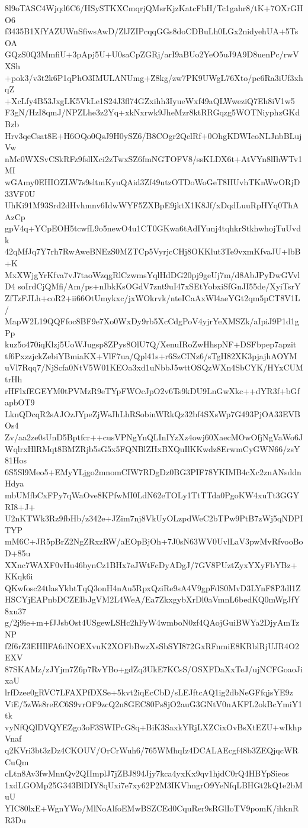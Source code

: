 8l9oTASC4Wjqd6C6/HSySTKXCmqrjQMsrKjzKatcFhH/Tc1gahr8/tK+7OXrGHO6
f3435B1XfYAZUWnSfiwsAwD/ZlJZIPcqqGGs8doCDBuLh0LGx2nidyehUA+5TsOA
GQzS0Q3MmfiU+3pApj5U+U0saCpZGRj/arI9aBUo2YeO5uJ9A9D8uenPc/rwVXSh
+pok3/v3t2k6P1qPhO3IMULANUmg+Z8kg/zw7PK9UWgL76Xto/pc6Ra3iUf3xhqZ
+XcLfy4B53JxgLK5VkLe1S24J3fl74GZxihh3IyueWxf49aQLWweziQ7Eh8iV1w5
F3gN/HzI8qmJ/NPZLhe3z2Yq+xkNxrwk9JheMzr8ktRRGqzg5WOTNiyphzGKdBzb
Hrv3qeCsat8E+H6OQo0QsJ9H0ySZ6/B8COgr2QelRf+0OhgKDWIcoNLJnbBLujVw
nMc0WXSvCSkRFz9fsllXci2zTwxSZ6fmNGTOFV8/ssKLDX6t+AtVYn8lIhWTv1MI
wGAmy0EHIOZLW7s9sltmKyuQAid3Zf49utzOTDoWoGeT8HUvhTKnWwORjD33VF0U
UhKi91M93Srd2dHvhmnv6IdwWYF5ZXBpE9jktX1K8Jf/xDqdLuuRpHYq0ThAAzCp
gpV4q+YCpEOH5tcwfL9o5newO4u1CT0GKwa6tAdIYunj4tqhkrStkhwhojTuUvdk
42qMfJq7Y7rh7RwAweBNEzS0MZTCp5VyrjcCHj8OKKlut3Te9vxmKfvaJU+lbB+K
MxXWjgYrKfva7vJ7taoWzqgRlCzwmsYqlHdDG20pj9geUj7m/d8AbJPyDwGVvlD4
soIrdCjQMfi/Am/ps+nIbkKsOGdV7znt9uI47xSEtYobxiSfGnJI55de/XyiTsrY
ZfTzFJLh+coR2+ii66OtUmykxc/jxWOkrvk/nteICaAxWl4aeYGt2qm5pCT8V1L/
MapW2L19QQFfoc8BF9e7Xo0WxDy9rb5XcCdgPoV4yjrYeXMSZk/aIpiJ9P1d1gPp
kuz5o470iqKlzj5UoWJugsp8ZPys8OlU7Q/XenuIRoZwHhspNF+DSFbpep7apzit
tf6PxzzjckZebiYBmiaKX+VlF7ua/Qpl41s+r6SzCINz6/sTgH82XK3pjajhAOYM
uVl7Rqq7/NjScfa0NtV5W01KEOa3xd1uNbbJ5wttOSQzWXn4SbCYK/HYxCUMtrHh
rHFlxfEGEYM0tPVMzR9eTYpFWOcJpO2v6Ts9kDU9LnGwXkc++dYR3f+bGfapbOT9
LknQDcqR2sAJOzJYpeZjWsJhLhRSobinWRkQz32bf4SXsWp7G493PjOA33EVBOs4
Zv/aa2ze0sUnD5Bptfcr++cusVPNgYnQLInIYzXz4owj60XaecMOwOfjNgVaWo6J
WqlrxHlRMqt8BMZRjb5sG5x5FQNBlZHxBXQuIlKKwdz8ErwmCyGWN66/zsY81Hos
6S5Sl9Meo5+EMyYLjgo2mnomCIW7RDgDz0BG3PIF78YKIMB4cXc2znANsddnHdya
mbUMfbCxFPy7qWaOve8KPfwMI0LdN62eTOLy1TtTTda0PgoKW4xuTt3GGYRI8+J+
U2nKTWk3Rz9fbHb/z342e+JZim7nj8VkUyOLzpdWeC2bTPw9PtB7zWj5qNDPITYP
mM6C+JR5pBrZ2NgZRxzRW/aEOpBjOh+7J0sN63WV0UvlLaV3pwMvRfvooBoD+85u
XXnc7WAXF0vHu46bynCz1BHx7eJWtFcDyADgJ/7GV8PUztZyxYXyFbYBz+KKqk6i
QKwfosc24tlasYkbtTqQ3onH4nAu5RpxQziRe9sA4V9gpFdS0MvD3LYnF8P3dl1Z
HSCYjEAPnbDCZEIbJgVM2L4WeA/Ea7ZkxgybXrDl0aVmnL6bedKQ0mWgJfY8xu37
g/2j9ie+m+fJJsbOst4USgewLSHc2hFyW4wmboN0zf4QAojGuiBWYa2DjyAmTzNP
f2f6rZ3EHIlFA6dNOEXvuK2XOFbBwzXsSbSYI872GxRFnmiE8KRblRjUJR4O2EXV
87SKAMz/zJYjm7Z6p7RvYBo+gdZq3UkE7KCsS/OSXFDaXxTeJ/ujNCFGoaoJixaU
lrfDzee0gRVC7LFAXPfDXSe+5kvt2iqEcCbD/sLEJftcAQ1ig2dbNeGFfqjsYE9z
ViE/5zWs8reEC6S9vrOF9zcQ2n8GEC80Ps8jO2auG3GNtV0nAKFL2okBcYmiY1tk
vyNfQQlDVQYEZgo3oF3SWIPcG8q+BiK3SaxkYRjLXZCixOvBsXtEZU+wIkhpVnaf
q2KVri3bt3zDz4CKOUV/OrCrWuh6/765WMhqIz4DCALAEcgf48b3ZEQjqcWRCuQm
cLtn8Av3fwMnnQv2QIImplJ7jZBJ894Jjy7kca4yxKx9qv1hjdC0rQ4HBYpSieos
1xdLGOMp25G343BlDIY8qUxi7e7xy62P2M3IKVhngrO9YeNfqLBHGt2kQ1e2bMuU
YIC80lxE+WgnYWo/MlNoAlfoEMwBSZCEd0CquRer9sRGlIoTV9pomK/ihknRR3Du
